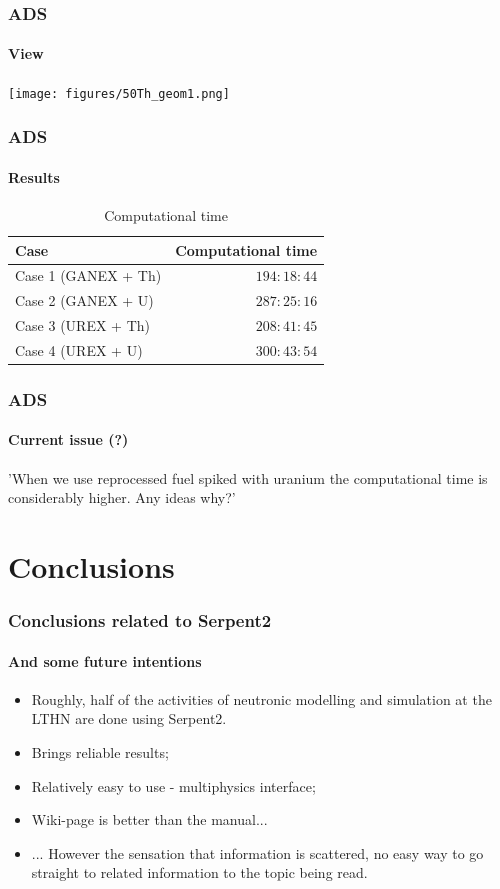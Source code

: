 \documentclass[svgnames,smaller,table,draft]{beamer}
\begin{document}
\begin{frame}
  \frametitle{ADS}
  \framesubtitle{View}
  \begin{center}
    \texttt{[image: figures/50Th\_geom1.png]}
    \end{center}
\end{frame}

\begin{frame}
  \frametitle{ADS}
  \framesubtitle{Results}
  \begin{table}%
    \caption{Computational time}
    \label{time}
    \centering
    \vspace{0.5cm}
    \begin{tabular}{l|r}\hline   
      Case & Computational time\\ \hline
      Case 1 (GANEX + Th) & $194:18:44 $\\ \hline
      Case 2 (GANEX + U) & $287:25:16 $\\ \hline
      Case 3 (UREX + Th) & $208:41:45 $\\ \hline
      Case 4 (UREX + U) & $300:43:54 $\\ \hline
    \end{tabular}
  \end{table}
  
\end{frame}

\begin{frame}
  \frametitle{ADS}
  \framesubtitle{Current issue (?)}
  'When we use reprocessed fuel spiked with uranium the computational time is considerably higher. Any ideas why?'
\end{frame}


\section{Conclusions}
\begin{frame}
  \frametitle{Conclusions related to Serpent2}
  \framesubtitle{And some future intentions}
  \begin{itemize}
  \item Roughly, half of the activities of neutronic modelling and simulation at the LTHN are done using Serpent2.
  \item Brings reliable results;
  \item Relatively easy to use - multiphysics interface;
  \item Wiki-page is better than the manual...
  \item ... However the sensation that information is scattered, no easy way to go straight to related information to the topic being read.
  \end{itemize}
\end{frame}
\end{document}
